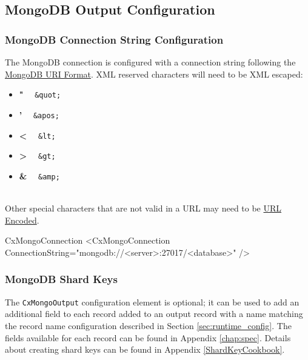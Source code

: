 \subsection{MongoDB Output Configuration}\label{sec:mongo_config}


\subsubsection{MongoDB Connection String Configuration}

The MongoDB connection is configured with a connection string following the \href{https://docs.mongodb.com/manual/reference/connection-string/}{MongoDB URI Format}.
XML reserved characters will need to be XML escaped:

\begin{itemize}
    \item \textbf{"} \ \faArrowRight \ \texttt{\&quot;}
    \item \textbf{'} \ \faArrowRight \ \texttt{\&apos;}
    \item \textbf{<} \ \faArrowRight \ \texttt{\&lt;}
    \item \textbf{>} \ \faArrowRight \ \texttt{\&gt;}
    \item \textbf{\&} \ \faArrowRight \ \texttt{\&amp;}
\end{itemize}

\noindent\\Other special characters that are not valid in a URL may need to be \href{https://www.w3schools.com/tags/ref_urlencode.ASP}{URL Encoded}.\\

\begin{xml}{CxMongoConnection}{\expandsenv\encrypts}{}
<CxMongoConnection
    ConnectionString="mongodb://<server>:27017/<database>"
/>
\end{xml}

\subsubsection{MongoDB Shard Keys}

The \texttt{CxMongoOutput} configuration element is optional; it can be used to add an additional field to each record
added to an output record with a name matching the record name configuration described in Section \ref{sec:runtime_config}.  The fields
available for each record can be found in Appendix \ref{chap:spec}. Details about creating shard keys can be found in Appendix \ref{ShardKeyCookbook}.

